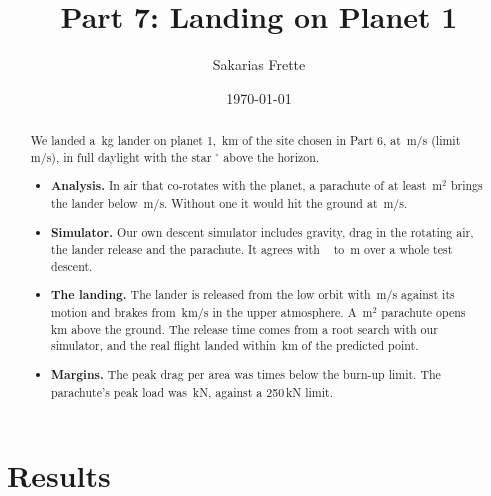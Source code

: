 \documentclass[aps,prd,twocolumn,nofootinbib,floatfix,superscriptaddress]{revtex4-2}
\begin{document}
\title{Part 7: Landing on Planet 1}
\author{Sakarias Frette}
\date{\today}

\begin{abstract}
We landed a \,kg lander on planet 1, \,km  of the site chosen in Part 6, at \,m/s (limit \,m/s), in full daylight with the star $^\circ$ above the horizon.
\begin{itemize}
\item \textbf{Analysis.} In air that co-rotates with the planet, a parachute of at least \,m$^2$ brings the lander below \,m/s. Without one it would hit the ground at \,m/s.
\item \textbf{Simulator.} Our own descent simulator includes gravity, drag in the rotating air, the lander release and the parachute. It agrees with ~\cite{ast2000tools} to \,m over a whole test descent.
\item \textbf{The landing.} The lander is released from the low orbit with \,m/s against its motion and brakes from \,km/s in the upper atmosphere. A \,m$^2$ parachute opens \,km above the ground. The release time comes from a root search with our simulator, and the real flight landed within \,km of the predicted point.
\item \textbf{Margins.} The peak drag per area was  times below the burn-up limit. The parachute's peak load was \,kN, against a 250\,kN limit.
\end{itemize}
\end{abstract}

\maketitle

\section{Results}
\end{document}
